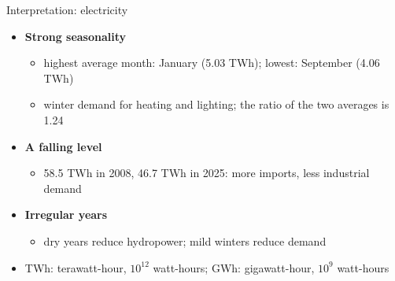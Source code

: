 \begin{frame}{Interpretation: electricity}
\itemsize{\small}
\begin{itemize}
    \item \textbf{Strong seasonality}
    \begin{itemize}
        \item highest average month: January (5.03 TWh); lowest: September (4.06 TWh)
        \item winter demand for heating and lighting; the ratio of the two averages is 1.24
    \end{itemize}
    \item \textbf{A falling level}
    \begin{itemize}
        \item 58.5 TWh in 2008, 46.7 TWh in 2025: more imports, less industrial demand
    \end{itemize}
    \item \textbf{Irregular years}
    \begin{itemize}
        \item dry years reduce hydropower; mild winters reduce demand
    \end{itemize}
    \item TWh: terawatt-hour, $10^{12}$ watt-hours; GWh: gigawatt-hour, $10^{9}$ watt-hours
\end{itemize}
\end{frame}


